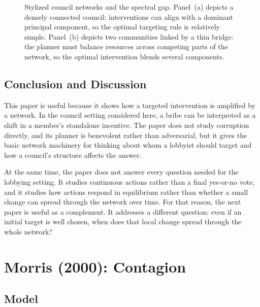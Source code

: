\documentclass[11pt,letterpaper]{article}
\begin{document}
\begin{figure}[t]
{\begin{minipage}{0.47\textwidth}
\end{minipage}
}
\caption{Stylized council networks and the spectral gap. Panel~(a) depicts a densely connected council: interventions can align with a dominant principal component, so the optimal targeting rule is relatively simple. Panel~(b) depicts two communities linked by a thin bridge: the planner must balance resources across competing parts of the network, so the optimal intervention blends several components.}
\label{fig:spectral-gap}
\end{figure}

\subsection{Conclusion and Discussion}

This paper is useful because it shows how a targeted intervention is amplified by a network. In the council setting considered here, a bribe can be interpreted as a shift in a member's standalone incentive. The paper does not study corruption directly, and its planner is benevolent rather than adversarial, but it gives the basic network machinery for thinking about whom a lobbyist should target and how a council's structure affects the answer.

At the same time, the paper does not answer every question needed for the lobbying setting. It studies continuous actions rather than a final yes-or-no vote, and it studies how actions respond in equilibrium rather than whether a small change can spread through the network over time. For that reason, the next paper is useful as a complement. It addresses a different question: even if an initial target is well chosen, when does that local change spread through the whole network?

\section{Morris (2000): Contagion}
\label{sec:morris}

\subsection{Model}
\end{document}
